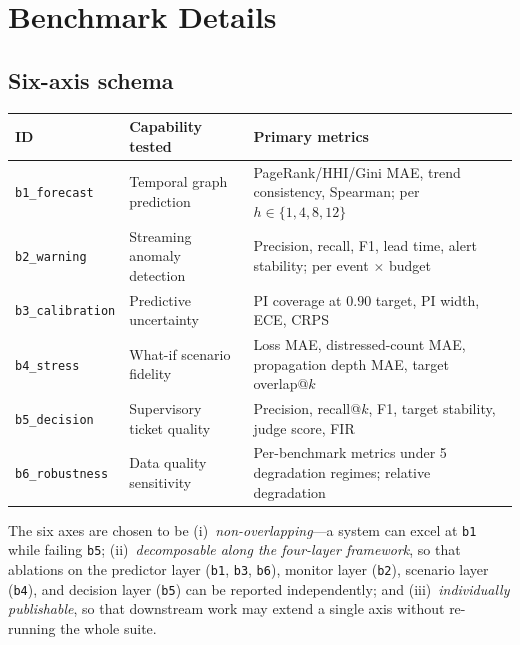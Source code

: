 \section{Benchmark Details}
\label{app:bench-details}

\subsection{Six-axis schema}
\begin{center}\small
\begin{tabularx}{\linewidth}{@{}llX@{}}
\toprule
ID                       & Capability tested                & Primary metrics \\
\midrule
\texttt{b1\_forecast}    & Temporal graph prediction        & PageRank/HHI/Gini MAE, trend consistency, Spearman; per $h\!\in\!\{1,4,8,12\}$ \\
\texttt{b2\_warning}     & Streaming anomaly detection      & Precision, recall, F1, lead time, alert stability; per event $\times$ budget \\
\texttt{b3\_calibration} & Predictive uncertainty           & PI coverage at $0.90$ target, PI width, ECE, CRPS \\
\texttt{b4\_stress}      & What-if scenario fidelity        & Loss MAE, distressed-count MAE, propagation depth MAE, target overlap@$k$ \\
\texttt{b5\_decision}    & Supervisory ticket quality       & Precision, recall@$k$, F1, target stability, judge score, FIR \\
\texttt{b6\_robustness}  & Data quality sensitivity         & Per-benchmark metrics under 5 degradation regimes; relative degradation \\
\bottomrule
\end{tabularx}
\end{center}

The six axes are chosen to be (i)~\emph{non-overlapping}---a system
can excel at \texttt{b1} while failing \texttt{b5};
(ii)~\emph{decomposable along the four-layer framework}, so that
ablations on the predictor layer (\texttt{b1}, \texttt{b3},
\texttt{b6}), monitor layer (\texttt{b2}), scenario layer
(\texttt{b4}), and decision layer (\texttt{b5}) can be reported
independently; and (iii)~\emph{individually publishable}, so that
downstream work may extend a single axis without re-running the
whole suite.

